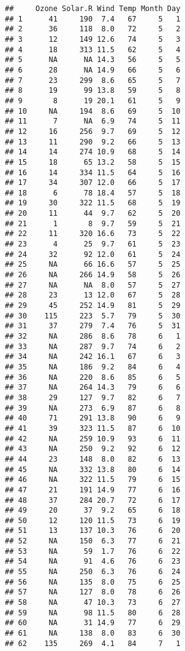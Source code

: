 \documentclass[
]{article}
\begin{document}
\begin{verbatim}
##     Ozone Solar.R Wind Temp Month Day
## 1      41     190  7.4   67     5   1
## 2      36     118  8.0   72     5   2
## 3      12     149 12.6   74     5   3
## 4      18     313 11.5   62     5   4
## 5      NA      NA 14.3   56     5   5
## 6      28      NA 14.9   66     5   6
## 7      23     299  8.6   65     5   7
## 8      19      99 13.8   59     5   8
## 9       8      19 20.1   61     5   9
## 10     NA     194  8.6   69     5  10
## 11      7      NA  6.9   74     5  11
## 12     16     256  9.7   69     5  12
## 13     11     290  9.2   66     5  13
## 14     14     274 10.9   68     5  14
## 15     18      65 13.2   58     5  15
## 16     14     334 11.5   64     5  16
## 17     34     307 12.0   66     5  17
## 18      6      78 18.4   57     5  18
## 19     30     322 11.5   68     5  19
## 20     11      44  9.7   62     5  20
## 21      1       8  9.7   59     5  21
## 22     11     320 16.6   73     5  22
## 23      4      25  9.7   61     5  23
## 24     32      92 12.0   61     5  24
## 25     NA      66 16.6   57     5  25
## 26     NA     266 14.9   58     5  26
## 27     NA      NA  8.0   57     5  27
## 28     23      13 12.0   67     5  28
## 29     45     252 14.9   81     5  29
## 30    115     223  5.7   79     5  30
## 31     37     279  7.4   76     5  31
## 32     NA     286  8.6   78     6   1
## 33     NA     287  9.7   74     6   2
## 34     NA     242 16.1   67     6   3
## 35     NA     186  9.2   84     6   4
## 36     NA     220  8.6   85     6   5
## 37     NA     264 14.3   79     6   6
## 38     29     127  9.7   82     6   7
## 39     NA     273  6.9   87     6   8
## 40     71     291 13.8   90     6   9
## 41     39     323 11.5   87     6  10
## 42     NA     259 10.9   93     6  11
## 43     NA     250  9.2   92     6  12
## 44     23     148  8.0   82     6  13
## 45     NA     332 13.8   80     6  14
## 46     NA     322 11.5   79     6  15
## 47     21     191 14.9   77     6  16
## 48     37     284 20.7   72     6  17
## 49     20      37  9.2   65     6  18
## 50     12     120 11.5   73     6  19
## 51     13     137 10.3   76     6  20
## 52     NA     150  6.3   77     6  21
## 53     NA      59  1.7   76     6  22
## 54     NA      91  4.6   76     6  23
## 55     NA     250  6.3   76     6  24
## 56     NA     135  8.0   75     6  25
## 57     NA     127  8.0   78     6  26
## 58     NA      47 10.3   73     6  27
## 59     NA      98 11.5   80     6  28
## 60     NA      31 14.9   77     6  29
## 61     NA     138  8.0   83     6  30
## 62    135     269  4.1   84     7   1

\end{verbatim}
\end{document}
